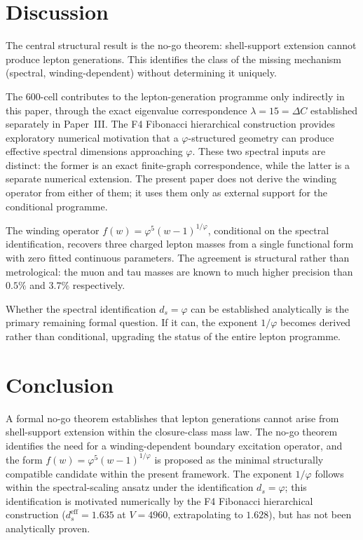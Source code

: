 \documentclass[12pt]{article}
\newcommand{\phig}{\varphi}
\newcommand{\ds}{d_s}
\newcommand{\dseff}{d_s^{\mathrm{eff}}}
\begin{document}
\section{Discussion}\label{sec:discussion}

The central structural result is the no-go theorem: shell-support extension cannot produce lepton generations. This identifies the class of the missing mechanism (spectral, winding-dependent) without determining it uniquely.

The 600-cell contributes to the lepton-generation programme only indirectly in this paper, through the exact eigenvalue correspondence $\lambda = 15 = \Delta C$ established separately in Paper~III. The F4 Fibonacci hierarchical construction provides exploratory numerical motivation that a $\phig$-structured geometry can produce effective spectral dimensions approaching $\phig$. These two spectral inputs are distinct: the former is an exact finite-graph correspondence, while the latter is a separate numerical extension. The present paper does not derive the winding operator from either of them; it uses them only as external support for the conditional programme.

The winding operator $f(w) = \phig^5 (w{-}1)^{1/\phig}$, conditional on the spectral identification, recovers three charged lepton masses from a single functional form with zero fitted continuous parameters. The agreement is structural rather than metrological: the muon and tau masses are known to much higher precision than $0.5\%$ and $3.7\%$ respectively.

Whether the spectral identification $\ds = \phig$ can be established analytically is the primary remaining formal question. If it can, the exponent $1/\phig$ becomes derived rather than conditional, upgrading the status of the entire lepton programme.

\section{Conclusion}\label{sec:conclusion}

A formal no-go theorem establishes that lepton generations cannot arise from shell-support extension within the closure-class mass law. The no-go theorem identifies the need for a winding-dependent boundary excitation operator, and the form $f(w) = \phig^5 (w{-}1)^{1/\phig}$ is proposed as the minimal structurally compatible candidate within the present framework. The exponent $1/\phig$ follows within the spectral-scaling ansatz under the identification $\ds = \phig$; this identification is motivated numerically by the F4 Fibonacci hierarchical construction ($\dseff = 1.635$ at $V = 4960$, extrapolating to $1.628$), but has not been analytically proven.
\end{document}
